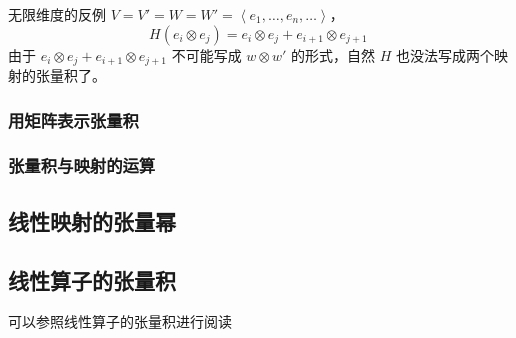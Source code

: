 

\begin{example}{无限维度的反例}
$V = V' = W = W' = \left\langle e_1, \dots, e_n, \dots \right\rangle$，
\begin{equation}
H(e_i \otimes e_j) = e_i \otimes e_j + e_{i + 1} \otimes e_{j + 1}~
\end{equation}
由于 $e_i \otimes e_j + e_{i + 1} \otimes e_{j + 1}$ 不可能写成 $w \otimes w'$ 的形式，自然 $H$ 也没法写成两个映射的张量积了。

\end{example}

\subsubsection{用矩阵表示张量积}



\subsubsection{张量积与映射的运算}



\subsection{线性映射的张量幂}


\subsection{线性算子的张量积}
可以参照线性算子的张量积进行阅读



